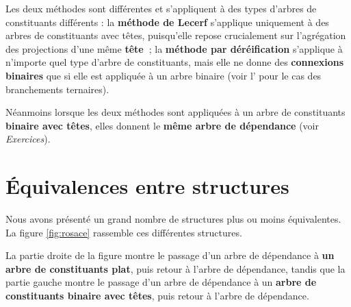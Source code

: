 Les deux méthodes sont différentes et s’appliquent à des types d’arbres de constituants différents : la \textbf{méthode de Lecerf} s’applique uniquement à des arbres de constituants avec têtes, puisqu’elle repose crucialement sur l’agrégation des projections d’une même \textbf{tête~}; la \textbf{méthode par déréification} s’applique à n’importe quel type d’arbre de constituants, mais elle ne donne des \textbf{connexions binaires} que si elle est appliquée à un arbre binaire (voir l’ pour le cas des branchements ternaires).

Néanmoins lorsque les deux méthodes sont appliquées à un arbre de constituants \textbf{binaire avec têtes}, elles donnent le \textbf{même arbre de dépendance} (voir \textit{Exercices}).

\section{Équivalences entre structures}\label{sec:3.4.25}

Nous avons présenté un grand nombre de structures plus ou moins équivalentes. La figure \ref{fig:rosace} rassemble ces différentes structures.

La partie droite de la figure montre le passage d’un arbre de dépendance à \textbf{un arbre de constituants plat}, puis retour à l’arbre de dépendance, tandis que la partie gauche montre le passage d’un arbre de dépendance à un \textbf{arbre de constituants binaire avec têtes}, puis retour à l’arbre de dépendance.

